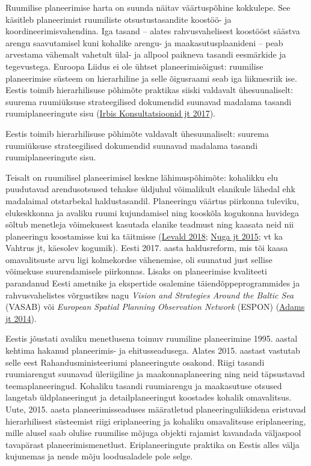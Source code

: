 \documentclass[estonian,]{article}
\begin{document}
Ruumilise planeerimise harta on suunda näitav väärtuspõhine kokkulepe. See käsitleb planeerimist ruumiliste otsustustasandite koostöö- ja koordineerimisvahendina. Iga tasand -- alates rahvusvahelisest koostööst säästva arengu saavutamisel kuni kohalike arengu- ja maakasutusplaanideni -- peab arvestama vähemalt vahetult ülal- ja allpool paikneva tasandi eesmärkide ja tegevustega. Euroopa Liidus ei ole ühtset planeerimisõigust: ruumilise planeerimise süsteem on hierarhiline ja selle õigusraami seab iga liikmesriik ise. Eestis toimib hierarhilisuse põhimõte praktikas siiski valdavalt ühesuunaliselt: suurema ruumiüksuse strateegilised dokumendid suunavad madalama tasandi ruumiplaneeringute sisu (\protect\hyperlink{Irbis2017}{Irbis Konsultatsioonid jt 2017}).

\begin{blockquote-left}
Eestis toimib hierarhilisuse põhimõte valdavalt ühesuunaliselt: suurema
ruumiüksuse strateegilised dokumendid suunavad madalama tasandi
ruumiplaneeringute sisu.
\end{blockquote-left}

Teisalt on ruumilisel planeerimisel keskne lähimuspõhimõte: kohalikku elu puudutavad arendusotsused tehakse üldjuhul võimalikult elanikule lähedal ehk madalaimal otstarbekal haldustasandil. Planeeringu väärtus piirkonna tuleviku, elukeskkonna ja avaliku ruumi kujundamisel ning kooskõla kogukonna huvidega sõltub menetleja võimekusest kasutada elanike teadmust ning kaasata neid nii planeeringu koostamisse kui ka täitmisse (\protect\hyperlink{Levald2018}{Levald 2018}; \protect\hyperlink{Nuga2015}{Nuga jt 2015}; vt ka Vahtrus jt, käesolev kogumik). Eesti 2017. aasta haldusreform, mis tõi kaasa omavalitsuste arvu ligi kolmekordse vähenemise, oli suunatud just sellise võimekuse suurendamisele piirkonnas. Lisaks on planeerimise kvaliteeti parandanud Eesti ametnike ja ekspertide osalemine täiendõppeprogrammides ja rahvusvahelistes võrgustikes nagu \emph{Vision and Strategies Around the Baltic Sea} (VASAB) või \emph{European Spatial Planning Observation Network} (ESPON) (\protect\hyperlink{Adams2014}{Adams jt 2014}).

Eestis jõustati avaliku menetlusena toimuv ruumiline planeerimine 1995. aastal kehtima hakanud planeerimis- ja ehitusseadusega. Alates 2015. aastast vastutab selle eest Rahandusministeeriumi planeeringute osakond. Riigi tasandi ruumiarengut suunavad üleriigiline ja maakonnaplaneering ning neid täpsustavad teemaplaneeringud. Kohaliku tasandi ruumiarengu ja maakasutuse otsused langetab üldplaneeringut ja detailplaneeringut koostades kohalik omavalitsus. Uute, 2015. aasta planeerimisseaduses määratletud planeeringuliikidena eristuvad hierarhilisest süsteemist riigi eriplaneering ja kohaliku omavalitsuse eriplaneering, mille alusel saab olulise ruumilise mõjuga objekti rajamist kavandada väljaspool tavapärast planeerimismenetlust. Eriplaneeringute praktika on Eestis alles välja kujunemas ja nende mõju loodusaladele pole selge.
\end{document}
